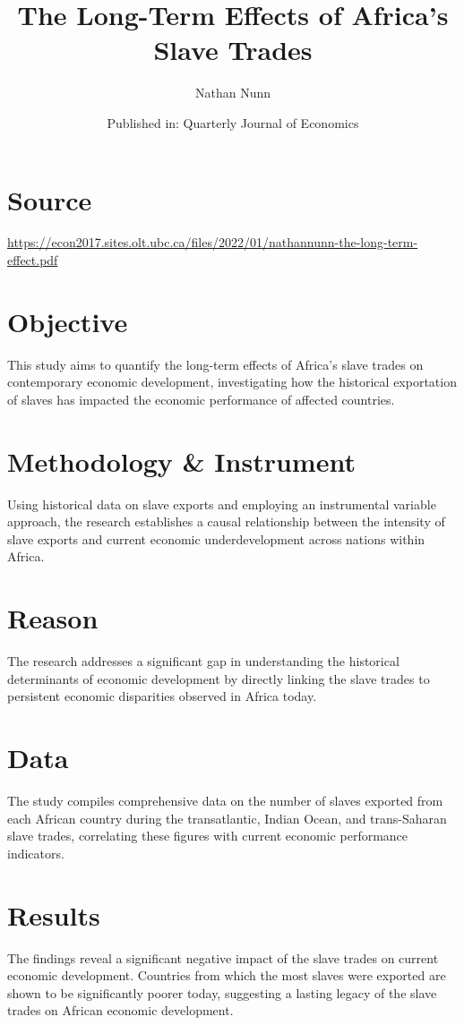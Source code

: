 \documentclass{article}
\title{The Long-Term Effects of Africa's Slave Trades}
\author{Nathan Nunn}
\date{Published in: Quarterly Journal of Economics}
\begin{document}
\maketitle

\section*{Source}
\href{https://econ2017.sites.olt.ubc.ca/files/2022/01/nathannunn-the-long-term-effect.pdf}{https://econ2017.sites.olt.ubc.ca/files/2022/01/nathannunn-the-long-term-effect.pdf}

\section*{Objective}
This study aims to quantify the long-term effects of Africa's slave trades on contemporary economic development, investigating how the historical exportation of slaves has impacted the economic performance of affected countries.

\section*{Methodology \& Instrument}
Using historical data on slave exports and employing an instrumental variable approach, the research establishes a causal relationship between the intensity of slave exports and current economic underdevelopment across nations within Africa.

\section*{Reason}
The research addresses a significant gap in understanding the historical determinants of economic development by directly linking the slave trades to persistent economic disparities observed in Africa today.

\section*{Data}
The study compiles comprehensive data on the number of slaves exported from each African country during the transatlantic, Indian Ocean, and trans-Saharan slave trades, correlating these figures with current economic performance indicators.

\section*{Results}
The findings reveal a significant negative impact of the slave trades on current economic development. Countries from which the most slaves were exported are shown to be significantly poorer today, suggesting a lasting legacy of the slave trades on African economic development.
\end{document}

